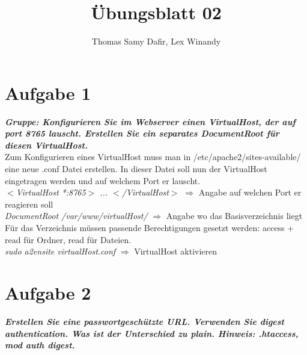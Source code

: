 \documentclass[12pt, a4paper]{report}
\title{Übungsblatt 02}
\author{Thomas Samy Dafir, Lex Winandy}
\date{}
\begin{document}
\maketitle

\section*{Aufgabe 1}
\textbf{\textit{Gruppe: Konfigurieren Sie im Webserver einen VirtualHost, der auf port 8765 lauscht.
Erstellen Sie ein separates DocumentRoot für diesen VirtualHost.}}\\
Zum Konfigurieren eines VirtualHost muss man in /etc/apache2/sites-available/ eine neue .conf Datei erstellen. In dieser Datei soll nun der VirtualHost eingetragen werden und auf welchem Port er lauscht. \\
\textit{$<$VirtualHost *:8765$>$ ... $<$/VirtualHost$>$} $\Rightarrow$ Angabe auf welchen Port er reagieren soll\\
\textit{DocumentRoot /var/www/virtualHost/} $\Rightarrow$ Angabe wo das Basisverzeichnis liegt \\
Für das Verzeichnis müssen passende Berechtigungen gesetzt werden: access + read für Ordner, read für Dateien.\\
\textit{sudo a2ensite virtualHost.conf} $\Rightarrow$ VirtualHost aktivieren\\

\section*{Aufgabe 2}
\textbf{\textit{Erstellen Sie eine passwortgeschützte URL. Verwenden Sie digest authentication. Was ist
der Unterschied zu plain. Hinweis: .htaccess, mod auth digest.}}\\
\end{document}
